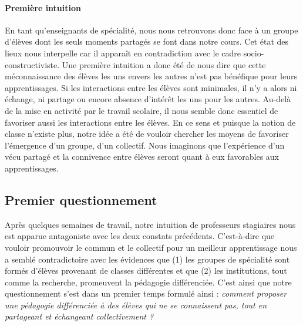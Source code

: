 \paragraph{Première intuition}
%
%
En tant qu'enseignants de spécialité, nous nous retrouvons donc face à un groupe d'élèves dont les seuls moments partagés se font dans notre cours. 
%
Cet état des lieux nous interpelle car il apparaît en contradiction avec le cadre socio-constructiviste. Une première intuition a donc été de nous dire que cette méconnaissance des élèves les uns envers les autres n'est pas bénéfique pour leurs apprentissages. Si les interactions entre les élèves sont minimales, il n'y a alors ni échange, ni partage ou encore absence d'intérêt les uns pour les autres.
%
Au-delà de la mise en activité par le travail scolaire, il nous semble donc essentiel de favoriser aussi les interactions entre les élèves. En ce sens et puisque la notion de classe n'existe plus, notre idée a été de vouloir chercher les moyens de favoriser l'émergence d'un groupe, d'un collectif. Nous imaginons que l'expérience d'un vécu partagé et la connivence entre élèves seront quant à eux favorables aux apprentissages.



\subsection{Premier questionnement}






%
%
Après quelques semaines de travail, notre intuition de professeurs stagiaires nous est apparue antagoniste avec les deux constats précédents. C'est-à-dire que vouloir promouvoir le commun et le collectif pour un meilleur apprentissage nous a semblé contradictoire avec les évidences que (1) les groupes de spécialité sont formés d'élèves provenant de classes différentes et que (2) les institutions, tout comme la recherche, promeuvent la pédagogie différenciée.
%
C'est ainsi que notre questionnement s'est dans un premier temps formulé ainsi  : \emph{comment proposer une pédagogie différenciée à des élèves qui ne se connaissent pas, tout en partageant et échangeant collectivement ?}





